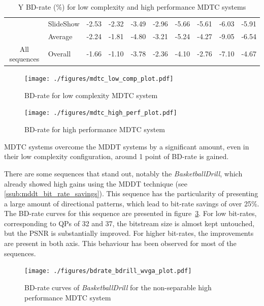 \documentclass[11pt,a4paper,openright,twoside]{book}
\numberwithin{equation}{section} %
\numberwithin{figure}{section} %
\numberwithin{table}{section} %
\begin{document}
\begin{table}[tb]
\begin{tabularx}{\textwidth}{c|X|rr|rr|rr|rr}
		& SlideShow              & -2.53 & -2.32 &  -3.49 & -2.96 & -5.66 & -5.61 & -6.03  &  -5.91 \\
		\cline{2-10} &
		Average                  & -2.24 & -1.81 &  -4.80 & -3.21 & -5.24 & -4.27 & -9.05  & -6.54 \\
		\hline
		\hline
		All sequences &
		Overall                  & -1.66 & -1.10 &  -3.78 & -2.36 & -4.10 & -2.76 & -7.10  &  -4.67 \\
	\end{tabularx}
	\caption{Y \acs{BD}-rate (\%) for low complexity and high performance \acs{MDTC} systems}
	\label{tab:bd_rate_mdtc}
\end{table}

\begin{figure}[tb]
	\centering
	\texttt{[image: ./figures/mdtc\_low\_comp\_plot.pdf]}
	\caption{\acs{BD}-rate for low complexity \acs{MDTC} system}
	\label{fig:mdtc_low_comp}
\end{figure}

\begin{figure}[tb]
	\centering
	\texttt{[image: ./figures/mdtc\_high\_perf\_plot.pdf]}
	\caption{\acs{BD}-rate for high performance \acs{MDTC} system}
	\label{fig:mdtc_high_perf}
\end{figure}

\ac{MDTC} systems overcome the \ac{MDDT} systems by a significant amount,
even in their low complexity configuration, around 1 point of \ac{BD}-rate is
gained.

There are some sequences that stand out, notably the \emph{BasketballDrill},
which already showed high gains using the \ac{MDDT} technique (see
\ref{ssub:mddt_bit_rate_savings}).
This sequence has the particularity of presenting a large amount of directional
patterns, which lead to bit-rate savings of over 25\%.
The \ac{BD}-rate curves for this sequence are presented in
figure~\ref{fig:mdtc_bdrate_bdrill}.
For low bit-rates, corresponding to \acp{QP} of 32 and 37, the bitstream size
is almost kept untouched, but the \ac{PSNR} is substantially improved.
For higher bit-rates, the improvements are present in both axis.
This behaviour has been observed for most of the sequences.

\begin{figure}[tb]
	\centering
	\texttt{[image: ./figures/bdrate\_bdrill\_wvga\_plot.pdf]}
	\caption[\acs{BD}-rate curves for \acs{MDTC} system on
	\emph{BasketballDrill}]
	{\acs{BD}-rate curves of \emph{BasketballDrill} for the non-separable high
	performance \acs{MDTC} system}
	\label{fig:mdtc_bdrate_bdrill}
\end{figure}
\end{document}
